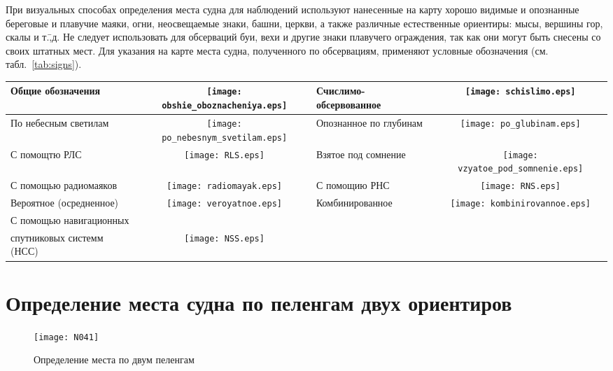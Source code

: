 При визуальных способах определения места судна для наблюдений
используют нанесенные на карту хорошо видимые и опознанные береговые и
плавучие маяки, огни, неосвещаемые знаки, башни, церкви, а также
различные естественные ориентиры: мысы, вершины гор, скалы и
т.\=,д. Не следует использовать для обсерваций буи, вехи и другие
знаки плавучего ограждения, так как они могут быть снесены со своих
штатных мест. Для указания на карте места судна, полученного по
обсервациям, применяют условные обозначения
(см. табл.~\ref{tab:signs}).

\begin{table*}[htb]
  \centering{}
  \begin{tabular}[c]{l|c||l|c}
    \toprule
    Общие обозначения & \texttt{[image: obshie\_oboznacheniya.eps]} & 
    Счислимо-обсервованное & \texttt{[image: schislimo.eps]} \\
    \midrule
    По небесным светилам & \texttt{[image: po\_nebesnym\_svetilam.eps]} & 
    Опознанное по глубинам & \texttt{[image: po\_glubinam.eps]} \\
    \midrule
    С помощтю РЛС & \texttt{[image: RLS.eps]} & 
    Взятое под сомнение & \texttt{[image: vzyatoe\_pod\_somnenie.eps]} \\
    \midrule
    С помощью радиомаяков & \texttt{[image: radiomayak.eps]} & 
    С помощию РНС & \texttt{[image: RNS.eps]} \\
    \midrule
    Вероятное (осредненное) & \texttt{[image: veroyatnoe.eps]} & 
    Комбинированное & \texttt{[image: kombinirovannoe.eps]}\\
    \midrule
    С помощью навигационных & \\
    спутниковых системм (НСС) & \texttt{[image: NSS.eps]} \\
    \bottomrule
  \end{tabular}
  \caption{Условные обозначения мест, полученных при обсервации}
  \label{tab:signs}
\end{table*}

\section{Определение места судна по пеленгам двух ориентиров}

\begin{figure}[htb]
  \centering{}
  \texttt{[image: N041]}
  \caption{Определение места по двум пеленгам}
  \label{fig:N41}
\end{figure}

